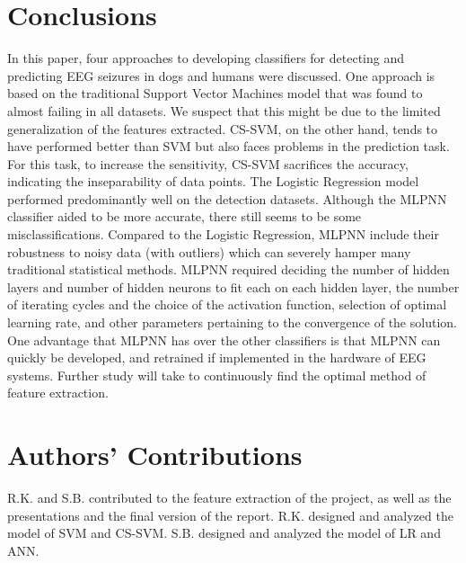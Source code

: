 \documentclass[10pt,twocolumn,letterpaper]{article}
\begin{document}
\section*{Conclusions} In this paper, four approaches to developing classifiers for detecting and predicting EEG seizures in dogs and humans were discussed. One approach is based on the traditional Support Vector Machines model that was found to almost failing in all datasets. We suspect that this might be due to the limited generalization of the features extracted. CS-SVM, on the other hand, tends to have performed better than SVM but also faces problems in the prediction task. For this task, to increase the sensitivity, CS-SVM sacrifices the accuracy, indicating the inseparability of data points. The Logistic Regression model performed predominantly well on the detection datasets. Although the MLPNN classifier aided to be more accurate, there still seems to be some misclassifications. Compared to the Logistic Regression, MLPNN include their robustness to noisy data (with outliers) which can severely hamper many traditional statistical methods. MLPNN required deciding the number of hidden layers and number of hidden neurons to fit each on each hidden layer, the number of iterating cycles and the choice of the activation function, selection of optimal learning rate, and other parameters pertaining to the convergence of the solution. One advantage that MLPNN has over the other classifiers is that MLPNN can quickly be developed, and retrained if implemented in the hardware of EEG systems. Further study will take to continuously find the optimal method of feature extraction.

\section*{Authors' Contributions}
R.K. and S.B. contributed to the feature extraction of the project, as well as the presentations and the final version of the report. R.K. designed and analyzed the model of SVM and CS-SVM. S.B. designed and analyzed the model of LR and ANN.
\end{document}
